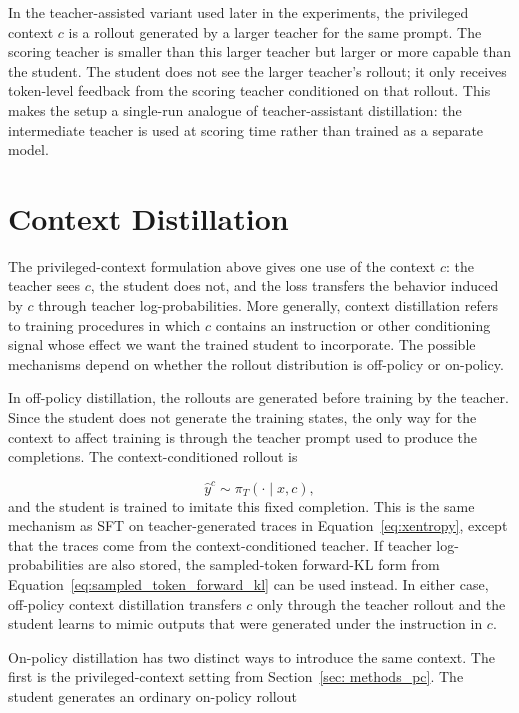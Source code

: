 In the teacher-assisted variant used later in the experiments, the privileged context $c$ is a rollout generated by a larger teacher for the same prompt. The scoring teacher is smaller than this larger teacher but larger or more capable than the student. The student does not see the larger teacher's rollout; it only receives token-level feedback from the scoring teacher conditioned on that rollout. This makes the setup a single-run analogue of teacher-assistant distillation: the intermediate teacher is used at scoring time rather than trained as a separate model.

\section{Context Distillation} \label{sec: methods_cd}

The privileged-context formulation above gives one use of the context $c$: the teacher sees $c$, the student does not, and the loss transfers the behavior induced by $c$ through teacher log-probabilities. More generally, context distillation refers to training procedures in which $c$ contains an instruction or other conditioning signal whose effect we want the trained student to incorporate. The possible mechanisms depend on whether the rollout distribution is off-policy or on-policy.

In off-policy distillation, the rollouts are generated before training by the teacher. Since the student does not generate the training states, the only way for the context to affect training is through the teacher prompt used to produce the completions. The context-conditioned rollout is

\begin{equation}
\hat{y}^c \sim \pi_T(\cdot \mid x,c),
\end{equation}
%
and the student is trained to imitate this fixed completion. This is the same mechanism as SFT on teacher-generated traces in Equation~\ref{eq:xentropy}, except that the traces come from the context-conditioned teacher. If teacher log-probabilities are also stored, the sampled-token forward-KL form from Equation~\ref{eq:sampled_token_forward_kl} can be used instead. In either case, off-policy context distillation transfers $c$ only through the teacher rollout and the student learns to mimic outputs that were generated under the instruction in $c$.

On-policy distillation has two distinct ways to introduce the same context. The first is the privileged-context setting from Section~\ref{sec: methods_pc}. The student generates an ordinary on-policy rollout

